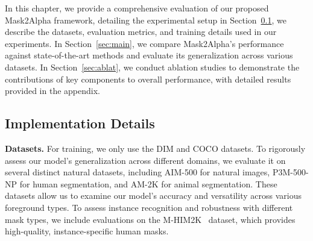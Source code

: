 \begin{table}[t]
    \centering
    \vspace{-0.1in}
    \caption{{\bf Quantitative Comparison with Instance-Aware Methods.} Unlike instance-aware methods that are trained on multi-instance human-specific datasets, our approach has not been trained on such datasets yet still demonstrates strong competitiveness in instance awareness across diverse scenarios.}
    \label{tab:instance_aware}
    \vspace{-0.1in}
\end{table}

In this chapter, we provide a comprehensive evaluation of our proposed Mask2Alpha framework, detailing the experimental setup in Section~\ref{sec:detail}, we describe the datasets, evaluation metrics, and training details used in our experiments.
In Section~\ref{sec:main}, we compare Mask2Alpha's performance against state-of-the-art methods and evaluate its generalization across various datasets. In Section~\ref{sec:ablat}, we conduct ablation studies to demonstrate the contributions of key components to overall performance, with detailed results provided in the appendix.

\subsection{Implementation Details}
\label{sec:detail}
{\bf Datasets.}
For training, we only use the DIM\cite{xu2017dim} and COCO\cite{lin2014coco} datasets. To rigorously assess our model's generalization across different domains, we evaluate it on several distinct natural datasets, including AIM-500\cite{li2021aim500} for natural images, P3M-500-NP\cite{rethink_p3m} for human segmentation, and AM-2K\cite{li2022am2k} for animal segmentation. These datasets allow us to examine our model’s accuracy and versatility across various foreground types. To assess instance recognition and robustness with different mask types, we include evaluations on the M-HIM2K~\cite{huynh2024maggie} dataset, which provides high-quality, instance-specific human masks.

